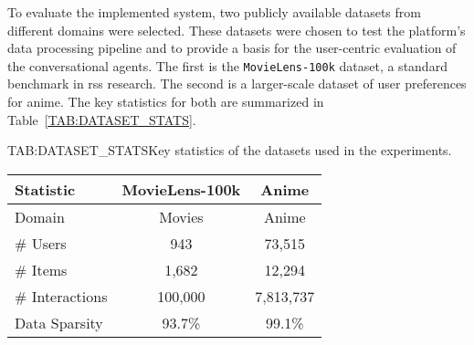 To evaluate the implemented system, two publicly available datasets from different domains were selected. These datasets were chosen to test the platform's data processing pipeline and to provide a basis for the user-centric evaluation of the conversational agents. The first is the \texttt{MovieLens-100k} dataset, a standard benchmark in \aclp{rs} research. The second is a larger-scale dataset of user preferences for anime. The key statistics for both are summarized in Table~\ref{TAB:DATASET_STATS}.

\begin{table}[Datasets Statistics]{TAB:DATASET_STATS}{Key statistics of the datasets used in the experiments.}
    \begin{tabular}{l c c}
        \hline
        \textbf{Statistic} & \textbf{MovieLens-100k} & \textbf{Anime} \\
        \hline
        Domain & Movies & Anime \\
        \# Users & 943 & 73,515 \\
        \# Items & 1,682 & 12,294 \\
        \# Interactions & 100,000 & 7,813,737 \\
        Data Sparsity & 93.7\% & 99.1\% \\
        \hline
    \end{tabular}
\end{table}